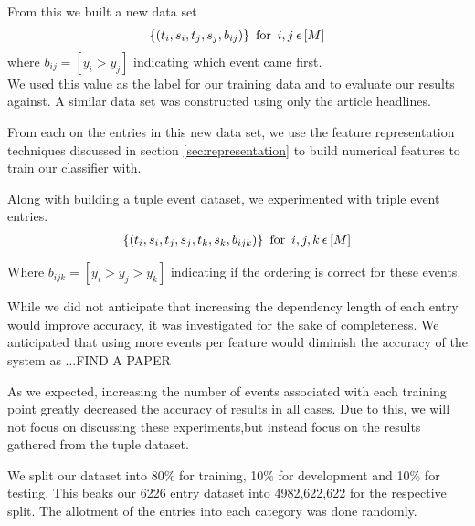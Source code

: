 \documentclass[bsc,frontabs,twoside,singlespacing,parskip,deptreport]{infthesis}     %
\begin{document}
    From this we built a new data set
    \begin{eqnarray}
      \{(t_{i},s_{i},t_{j},s_{j},b_{ij})\} \hspace{0.5em} \text{for} \hspace{0.5em} i,j \hspace{0.2em}\epsilon \hspace{0.2em}[M]\nonumber
    \end{eqnarray}
    where $b_{ij} = [y_{i} > y_{j}]$ indicating which event came first.\\
    We used this value as the label for our training data and to evaluate our results against.
    A similar data set was constructed using only the article headlines.
    
    From each on the entries in this new data set, we use the feature representation techniques discussed in section \ref{sec:representation} to build numerical
    features to train our classifier with.

Along with building a tuple event dataset, we experimented with triple event entries.
\begin{eqnarray}
      \{(t_{i},s_{i},t_{j},s_{j},t_{k},s_{k},b_{ijk})\} \hspace{0.5em} \text{for} \hspace{0.5em} i,j,k \hspace{0.2em}\epsilon \hspace{0.2em}[M]\nonumber
\end{eqnarray}

Where $b_{ijk} = [y_i > y_j > y_k]$ indicating if the ordering is correct for these events.

While we did not anticipate that increasing the dependency length of each entry would improve accuracy, it was investigated
for the sake of completeness. We anticipated that using more events per feature would diminish the accuracy of the system as
...FIND A PAPER

As we expected, increasing the number of events associated with each training point greatly decreased the accuracy of results in all cases.
Due to this, we will not focus on discussing these experiments,but instead focus on the results gathered from the tuple dataset.

We split our dataset into 80\% for training, 10\% for development and 10\% for testing.
This beaks our 6226 entry dataset into 4982,622,622 for the respective split.
The allotment of the entries into each category was done randomly.
\end{document}
